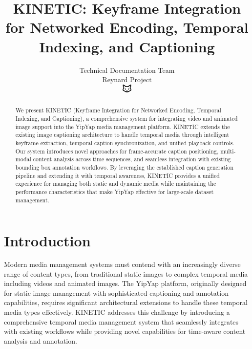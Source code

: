 \documentclass[10pt]{article}
\begin{document}
\title{KINETIC: Keyframe Integration for Networked Encoding, Temporal Indexing, and Captioning}

\author{Technical Documentation Team\\
Reynard Project\\
\includegraphics[width=0.5cm]{../../shared-assets/favicon.pdf}}

\maketitle

\begin{abstract}
We present KINETIC (Keyframe Integration for Networked Encoding, Temporal Indexing, and Captioning), a comprehensive system for integrating video and animated image support into the YipYap media management platform. KINETIC extends the existing image captioning architecture to handle temporal media through intelligent keyframe extraction, temporal caption synchronization, and unified playback controls. Our system introduces novel approaches for frame-accurate caption positioning, multi-modal content analysis across time sequences, and seamless integration with existing bounding box annotation workflows. By leveraging the established caption generation pipeline and extending it with temporal awareness, KINETIC provides a unified experience for managing both static and dynamic media while maintaining the performance characteristics that make YipYap effective for large-scale dataset management.
\end{abstract}

\section{Introduction}

Modern media management systems must contend with an increasingly diverse range of content types, from traditional static images to complex temporal media including videos and animated images. The YipYap platform, originally designed for static image management with sophisticated captioning and annotation capabilities, requires significant architectural extensions to handle these temporal media types effectively. KINETIC addresses this challenge by introducing a comprehensive temporal media management system that seamlessly integrates with existing workflows while providing novel capabilities for time-aware content analysis and annotation.
\end{document}
